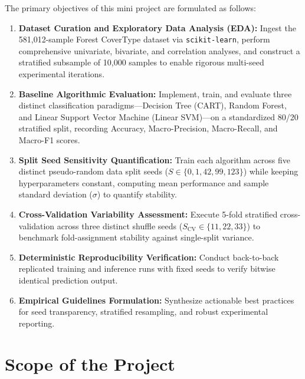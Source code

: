The primary objectives of this mini project are formulated as follows:
\begin{enumerate}
    \item \textbf{Dataset Curation and Exploratory Data Analysis (EDA):} Ingest the 581,012-sample Forest CoverType dataset via \texttt{scikit-learn}, perform comprehensive univariate, bivariate, and correlation analyses, and construct a stratified subsample of 10,000 samples to enable rigorous multi-seed experimental iterations.
    \item \textbf{Baseline Algorithmic Evaluation:} Implement, train, and evaluate three distinct classification paradigms---Decision Tree (CART), Random Forest, and Linear Support Vector Machine (Linear SVM)---on a standardized 80/20 stratified split, recording Accuracy, Macro-Precision, Macro-Recall, and Macro-F1 scores.
    \item \textbf{Split Seed Sensitivity Quantification:} Train each algorithm across five distinct pseudo-random data split seeds ($S \in \{0, 1, 42, 99, 123\}$) while keeping hyperparameters constant, computing mean performance and sample standard deviation ($\sigma$) to quantify stability.
    \item \textbf{Cross-Validation Variability Assessment:} Execute 5-fold stratified cross-validation across three distinct shuffle seeds ($S_{\text{CV}} \in \{11, 22, 33\}$) to benchmark fold-assignment stability against single-split variance.
    \item \textbf{Deterministic Reproducibility Verification:} Conduct back-to-back replicated training and inference runs with fixed seeds to verify bitwise identical prediction output.
    \item \textbf{Empirical Guidelines Formulation:} Synthesize actionable best practices for seed transparency, stratified resampling, and robust experimental reporting.
\end{enumerate}

\section{Scope of the Project}
\label{sec:scope}

